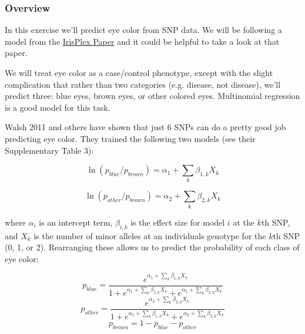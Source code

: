 \documentclass[12pt]{article}
\begin{document}
\subsubsection*{Overview}

In this exercise we'll predict eye color from SNP data. We will be following a model from the \href{https://www.ncbi.nlm.nih.gov/pubmed/20457092}{IrisPlex Paper} and it could be helpful to take a look at that paper. 

We will treat eye color as a case/control phenotype, except with the slight complication that rather than two categories (e.g. disease, not disease), we'll predict three: blue eyes, brown eyes, or other colored eyes. Multinomial regression is a good model for this task.

Walsh 2011 and others have shown that just 6 SNPs can do a pretty good job predicting eye color. They trained the following two models (see their Supplementary Table 3):

\begin{equation}
\ln(p_{blue}/p_{brown}) = \alpha_1 + \sum_{k}\beta_{1, k}X_k
\end{equation}

\begin{equation}
\ln(p_{other}/p_{brown}) = \alpha_2 + \sum_{k}\beta_{2, k}X_k
\end{equation}

where $\alpha_i$ is an intercept term, $\beta_{i,k}$ is the effect size for model $i$ at the $k$th SNP, and $X_k$ is the number of minor alleles at an individuals genotype for the $k$th SNP (0, 1, or 2). Rearranging these allows us to predict the probability of each class of eye color:

\begin{equation}
p_{blue} = \frac{e^{\alpha_1 + \sum_k \beta_{1,k}X_k}}{1+e^{\alpha_1 + \sum_k \beta_{1,k}X_k}+e^{\alpha_2 + \sum_k \beta_{2,k}X_k}}
\end{equation}
\begin{equation}
p_{other} = \frac{e^{\alpha_2 + \sum_k \beta_{2,k}X_k}}{1+e^{\alpha_1 + \sum_k \beta_{1,k}X_k}+e^{\alpha_2 + \sum_k \beta_{2,k}X_k}}
\end{equation}
\begin{equation}
p_{brown} = 1-p_{blue}-p_{other}
\end{equation}
\end{document}
